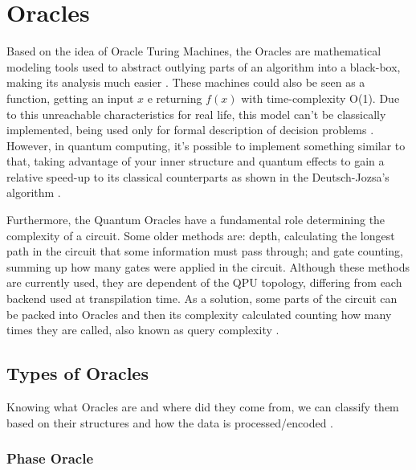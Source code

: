 \documentclass[sn-mathphys-num]{sn-jnl}
\begin{document}
\section{Oracles}\label{oracles}

Based on the idea of Oracle Turing Machines, the Oracles are mathematical modeling tools used to abstract outlying parts of an algorithm into a black-box, making its analysis much easier \cite{SOARE2009368} \cite{brodkorb_2019_the} \cite{davis_2006_turing} \cite{viswanathan_2013_reductions}. These machines could also be seen as a function, getting an input $x$ e returning $f(x)$ with time-complexity O(1). Due to this unreachable characteristics for real life, this model can't be classically implemented, being used only for formal description of decision problems \cite{kalyanasyndaram_2021_mod04lec23} \cite{amreen_oracle} \cite{e21080800}.
However, in quantum computing, it's possible to implement something similar to that, taking advantage of your inner structure and quantum effects to gain a relative speed-up to its classical counterparts as shown in the Deutsch-Jozsa's algorithm \cite{Fan_2007}. 

Furthermore, the Quantum Oracles have a fundamental role determining the complexity of a circuit. Some older methods are: depth, calculating the longest path in the circuit that some information must pass through; and gate counting, summing up how many gates were applied in the circuit. Although these methods are currently used, they are dependent of the QPU topology, differing from each backend used at transpilation time. As a solution, some parts of the circuit can be packed into Oracles and then its complexity calculated counting how many times they are called, also known as query complexity \cite{odonnell_2015_lecture} \cite{odonnell_2015_lecture_2} \cite{e21080800}.

\subsection{Types of Oracles}\label{oraclesTypes}

Knowing what Oracles are and where did they come from, we can classify them based on their structures and how the data is processed/encoded \cite{Kashefi_2002}.

\subsubsection{Phase Oracle}\label{phaseOracle}
\end{document}
